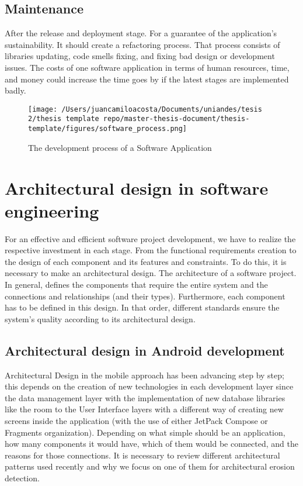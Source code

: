 \subsection{Maintenance}
After the release and deployment stage. For a guarantee of the application's sustainability. It should create a refactoring process. That process consists of libraries updating, code smells fixing, and fixing bad design or development issues. The costs of one software application in terms of human resources, time, and money could increase the time goes by if the latest stages are implemented badly.

\begin{figure}[h]
    	\centering
    		\texttt{[image: /Users/juancamiloacosta/Documents/uniandes/tesis 2/thesis template repo/master-thesis-document/thesis-template/figures/software\_process.png]}
   			 \caption{The development process of a Software Application}
   			 \label{fig:ast}
\end{figure}


\section{Architectural design in software engineering}
For an effective and efficient software project development, we have to realize the respective investment in each stage. From the functional requirements creation to the design of each component and its features and constraints. To do this, it is necessary to make an architectural design. The architecture of a software project. In general, defines the components that require the entire system and the connections and relationships (and their types). Furthermore, each component has to be defined in this design. In that order, different standards ensure the system’s quality according to its architectural design.

\subsection{Architectural design in Android development}
Architectural Design in the mobile approach has been advancing step by step; this depends on the creation of new technologies in each development layer since the data management layer with the implementation of new database libraries like the room to the User Interface layers with a different way of creating new screens inside the application (with the use of either JetPack Compose or Fragments organization).
Depending on what simple should be an application, how many components it would have, which of them would be connected, and the reasons for those connections. It is necessary to review different architectural patterns used recently and why we focus on one of them for architectural erosion detection.

